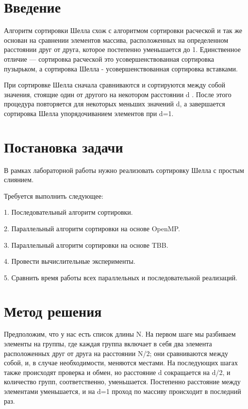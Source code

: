 \documentclass{report}
\begin{document}
\setcounter{page}{2}

\newpage

\section*{Введение}
 Алгоритм сортировки Шелла схож с алгоритмом сортировки расческой и так же основан на сравнении элементов массива, расположенных на определенном расстоянии друг от друга, которое постепенно уменьшается до 1. Единственное отличие — сортировка расческой это усовершенствованная сортировка пузырьком, а сортировка Шелла - усовершенствованная сортировка вставками.
\par
При сортировке Шелла сначала сравниваются и сортируются между собой значения, стоящие один от другого на некотором расстоянии d . После этого процедура повторяется для некоторых меньших значений d, а завершается сортировка Шелла упорядочиванием элементов при d=1.
\newpage

\section*{Постановка задачи}
В рамках лабораторной работы нужно реализовать сортировку Шелла с простым слиянием.
\par
Требуется выполнить следующее:
\par
1.	Последовательный алгоритм сортировки.
\par
2.	Параллельный алгоритм сортировки на основе OpenMP.
\par
3.	Параллельный алгоритм сортировки на основе TBB.
\par
4.	Провести вычислительные эксперименты.
\par
5.	Сравнить время работы всех параллельных и последовательной реализаций.
\newpage

\section*{Метод решения}
Предположим, что у нас есть список длины N. На первом шаге мы разбиваем элементы на группы, где каждая группа включает в себя два элемента расположенных друг от друга на расстоянии N/2; они сравниваются между собой, и, в случае необходимости, меняются местами. На последующих шагах также происходят проверка и обмен, но расстояние d сокращается на d/2, и количество групп, соответственно, уменьшается. Постепенно расстояние между элементами уменьшается, и на d=1 проход по массиву происходит в последний раз. 
\newpage
\end{document}
